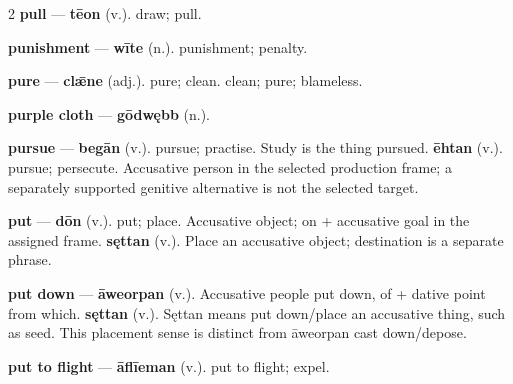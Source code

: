 \begin{multicols}{2}
\textbf{pull} — \textbf{tēon} (v.). draw; pull.\par
\textbf{punishment} — \textbf{wīte} (n.). punishment; penalty.\par
\textbf{pure} — \textbf{clǣne} (adj.). pure; clean. clean; pure; blameless.\par
\textbf{purple cloth} — \textbf{gōdwębb} (n.).\par
\textbf{pursue} — \textbf{begān} (v.). pursue; practise. Study is the thing pursued. \textbf{ēhtan} (v.). pursue; persecute. Accusative person in the selected production frame; a separately supported genitive alternative is not the selected target.\par
\textbf{put} — \textbf{dōn} (v.). put; place. Accusative object; on + accusative goal in the assigned frame. \textbf{sęttan} (v.). Place an accusative object; destination is a separate phrase.\par
\textbf{put down} — \textbf{āweorpan} (v.). Accusative people put down, of + dative point from which. \textbf{sęttan} (v.). Sęttan means put down/place an accusative thing, such as seed. This placement sense is distinct from āweorpan cast down/depose.\par
\textbf{put to flight} — \textbf{āflīeman} (v.). put to flight; expel.\par

\end{multicols}

